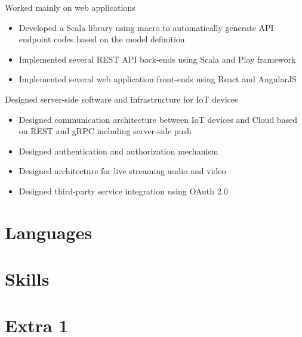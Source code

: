 \documentclass[11pt,a4paper,sans]{moderncv}
\begin{document}
%
{Worked mainly on web applications%
\begin{itemize}%
\item Developed a Scala library using macro to automatically generate API
    endpoint codes based on the model definition
\item Implemented several REST API back-ends using Scala and Play framework
\item Implemented several web application front-ends using React and AngularJS
\end{itemize}}

%
{Designed server-side software and infrastructure for IoT devices%
\begin{itemize}%
\item Designed communication architecture between IoT devices and Cloud
    based on REST and gRPC including server-side push
\item Designed authentication and authorization mechanism
\item Designed architecture for live streaming audio and video
\item Designed third-party service integration using OAuth 2.0
\end{itemize}}

\section{Languages}

\section{Skills}

\section{Extra 1}
\end{document}
